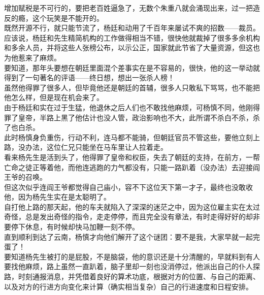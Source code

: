 \begin{multicols}{\theparacolNo}
增加赋税是不可行的，要把老百姓逼急了，无数个朱重八就会涌现出来，过一把造反的瘾，这个玩笑是不能开的。\\

既然开源不行，就只能节流了，杨廷和动用了千百年来屡试不爽的招数——裁员。\\

应该说，杨廷和先生精简机构的工作做得相当不错，很快他就裁掉了很多多余机构和多余人员，并将这些人张榜公布，以示公正，国家就此节省了大量资源，但这也为他惹来了麻烦。\\

要知道，那年头要想在朝廷里面混个差事实在是不容易的，很快，他的这一举动就得到了一句著名的评语——终日想，想出一张杀人榜！\\

虽然他得罪了很多人，但毕竟他还是朝廷的首辅，很多人只敢私下骂骂，也不能把他怎么样，但是现在机会来了。\\

由于杨廷和实在过于生猛，他退休之后人们也不敢找他麻烦，可杨慎不同，他刚得罪了皇帝，半路上黑了他估计也没人管，政治影响也不大，此所谓不杀白不杀，杀了也白杀。\\

此时杨慎身负重伤，行动不利，连马都不能骑，但朝廷官员不管这些，要他立刻上路，没办法，这位仁兄只能坐在马车里让人拉着走。\\

看来杨先生是活到头了，他得罪了皇帝和权臣，失去了朝廷的支持，在前方，一帮亡命之徒正等着他，而他连逃跑的力气都没有，只能一路趴着（没办法）去迎接阎王爷的召唤。\\

但这次似乎连阎王爷都觉得自己庙小，容不下这位天下第一才子，最终也没敢收他，因为杨先生实在是太聪明了。\\

自打他上路的那天起，他的车夫就陷入了深深的迷茫之中，因为这位雇主实在太过奇怪，总是发出奇怪的指令，走走停停，而且完全没有章法，有时走得好好的却非要停下休息，有时候却快马加鞭一刻不停。\\

直到顺利到达了云南，杨慎才向他们解开了这个谜团：要不是我，大家早就一起完蛋了！\\

要知道杨先生被打的是屁股，不是脑袋，他的意识还是十分清醒的，早就料到有人要找他麻烦，路上虽然一直趴着，脑子里却一刻也没消停过，他派出自己的仆人探路，时刻通报消息，并凭借着良好的算术功底，根据对方的位置、与自己的距离、以及对方的行进方向变化来计算（确实相当复杂）自己的行进速度和日程安排。\\


\end{multicols}
